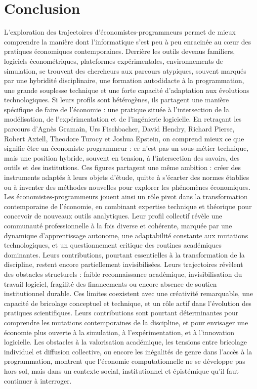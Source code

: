 
\section{Conclusion}


L’exploration des trajectoires d’économistes-programmeurs permet de mieux comprendre la manière dont l’informatique s’est peu à peu enracinée au cœur des pratiques économiques contemporaines. Derrière les outils devenus familiers, logiciels économétriques, plateformes expérimentales, environnements de simulation, se trouvent des chercheurs aux parcours atypiques, souvent marqués par une hybridité disciplinaire, une formation autodidacte à la programmation, une grande souplesse technique et une forte capacité d’adaptation aux évolutions technologiques. Si leurs profils sont hétérogènes, ils partagent une manière spécifique de faire de l’économie : une pratique située à l’intersection de la modélisation, de l’expérimentation et de l’ingénierie logicielle. En retraçant les parcours d’Agnès Gramain, Urs Fischbacher, David Hendry, Richard Pierse, Robert Axtell, Theodore Turocy et Joshua Epstein, on comprend mieux ce que signifie être un économiste-programmeur : ce n’est pas un sous-métier technique, mais une position hybride, souvent en tension, à l’intersection des savoirs, des outils et des institutions. Ces figures partagent une même ambition : créer des instruments adaptés à leurs objets d’étude, quitte à s’écarter des normes établies ou à inventer des méthodes nouvelles pour explorer les phénomènes économiques. Les économistes-programmeurs jouent ainsi un rôle pivot dans la transformation contemporaine de l’économie, en combinant expertise technique et théorique pour concevoir de nouveaux outils analytiques. Leur profil collectif révèle une communauté professionnelle à la fois diverse et cohérente, marquée par une dynamique d’apprentissage autonome, une adaptabilité constante aux mutations technologiques, et un questionnement critique des routines académiques dominantes. Leurs contributions, pourtant essentielles à la transformation de la discipline, restent encore partiellement invisibilisées. Leurs trajectoires révèlent des obstacles structurels : faible reconnaissance académique, invisibilisation du travail logiciel, fragilité des financements ou encore absence de soutien institutionnel durable. Ces limites coexistent avec une créativité remarquable, une capacité de bricolage conceptuel et technique, et un rôle actif dans l’évolution des pratiques scientifiques. Leurs contributions sont pourtant déterminantes pour comprendre les mutations contemporaines de la discipline, et pour envisager une économie plus ouverte à la simulation, à l’expérimentation, et à l’innovation logicielle. Les obstacles à la valorisation académique, les tensions entre bricolage individuel et diffusion collective, ou encore les inégalités de genre dans l’accès à la programmation, montrent que l’économie computationnelle ne se développe pas hors sol, mais dans un contexte social, institutionnel et épistémique qu’il faut continuer à interroger.


